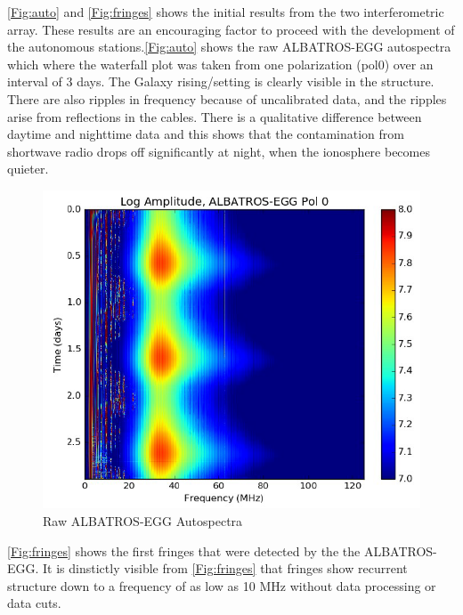 \documentclass{ws-jai}
\begin{document}
\autoref{Fig:auto} and \autoref{Fig:fringes} shows the initial results from the two interferometric array. These results are an encouraging factor to proceed with the development of the autonomous stations.\autoref{Fig:auto} shows the raw ALBATROS-EGG autospectra which where the waterfall plot was taken from one polarization (pol0) over an interval of 3 days. The Galaxy rising/setting is clearly visible in the structure. There are also ripples in frequency because of uncalibrated data, and the ripples arise from reflections in the cables. There is a qualitative difference between daytime and nighttime data and this shows that the contamination from shortwave radio drops off significantly at night, when the ionosphere becomes quieter.

\begin{figure}[h!]
	\begin{center}
		\includegraphics[width=0.8\linewidth]{Figures/Raw-ALBATROS-autospectra.PNG}
		\caption{Raw ALBATROS-EGG Autospectra}
		\label{Fig:auto}
	\end{center}
\end{figure}

\autoref{Fig:fringes} shows the first fringes that were detected by the the ALBATROS-EGG. It is dinstictly visible from \autoref{Fig:fringes} that fringes show recurrent structure down to a frequency of as low as 10 MHz without data processing or data cuts.
\end{document}
